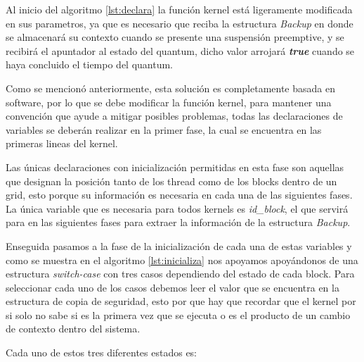 Al inicio del algoritmo \ref{lst:declara} la función kernel está ligeramente modificada en sus parametros, ya que es necesario que reciba la estructura \textit{Backup} en donde se almacenará su contexto cuando se presente una suspensión preemptive, y se recibirá el apuntador al estado del quantum, dicho valor arrojará \textbf{\textit{true}} cuando se haya concluido el tiempo del quantum.
\newline

Como se mencionó anteriormente, esta solución es completamente basada en software, por lo que se debe modificar la función kernel, para mantener una convención que ayude a mitigar posibles problemas, todas las declaraciones de variables se deberán realizar en la primer fase, la cual se encuentra en las primeras lineas del kernel.
\newline

Las únicas declaraciones con inicialización permitidas en esta fase son aquellas que designan la posición tanto de los thread como de los blocks dentro de un grid, esto porque  su información es necesaria en cada una de las siguientes fases. La única variable que es necesaria para todos kernels es \textit{id\_block}, el que servirá para en las siguientes fases para extraer la información de la estructura \textit{Backup}.



Enseguida pasamos a la fase de la inicialización de cada una de estas variables y como se muestra en el algoritmo \ref{lst:inicializa} nos apoyamos apoyándonos de una estructura \textit{switch-case} con tres casos dependiendo del estado de cada block. Para seleccionar cada uno de los casos debemos leer el valor que se encuentra en la estructura de copia de seguridad, esto por que hay que recordar que el kernel por si solo no sabe si es la primera vez que se ejecuta o es el producto de un cambio de contexto dentro del sistema.
\newline

Cada uno de estos tres diferentes estados es:

